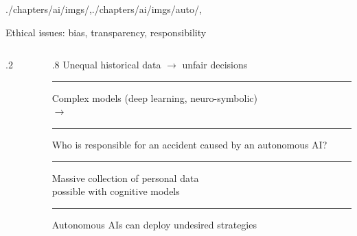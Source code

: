 \begin{graphicspathcontext}{{./chapters/ai/imgs/},{./chapters/ai/imgs/auto/},\old}

\begin{frame}[t]{{Ethical issues:} bias, transparency, responsibility}
	\vspace{-.3cm}
	\begin{columns}[T]
		\begin{column}{.2\linewidth}
			\begin{bottomarrowsequence}[width=\linewidth]
			\end{bottomarrowsequence}
		\end{column}
		\begin{column}{.8\linewidth}
			Unequal historical data $\rightarrow$ unfair decisions \\
			\vspace{.2cm}
			\hrule
			\vspace{.3cm}
			Complex models (deep learning, neuro-symbolic)  \\
			$\rightarrow$  %
			\vspace{.3cm}
			\hrule
			\vspace{.58cm}
			Who is responsible for an accident caused by an autonomous AI? %
			\vspace{.58cm}
			\hrule
			\vspace{.33cm}
			Massive collection of personal data \\
			 possible with cognitive models %
			\vspace{.33cm}
			\hrule
			\vspace{.6cm}
			Autonomous AIs can deploy undesired strategies %
		\end{column}
	\end{columns}
\end{frame}

\end{graphicspathcontext}

\endinput
